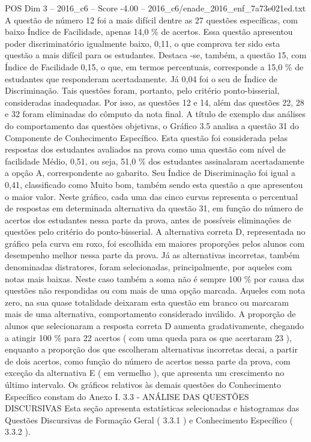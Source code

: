 \begin{textsample}{POS Dim 3 – 2016\_c6 – Score -4.00 – 2016\_c6/enade\_2016\_enf\_7a73e021ed.txt}
A questão de número 12 foi a mais difícil dentre as 27 questões específicas, com baixo Índice de Facilidade, apenas 14,0 \% de acertos.
Essa questão apresentou poder discriminatório igualmente baixo, 0,11, o que comprova ter sido esta questão a mais difícil para os estudantes.
Destaca -se, também, a questão 15, com Índice de Facilidade 0,15, o que, em termos percentuais, corresponde a 15,0 \% de estudantes que responderam acertadamente.
Já 0,04 foi o seu de Índice de Discriminação.
Tais questões foram, portanto, pelo critério ponto-bisserial, consideradas inadequadas.
Por isso, as questões 12 e 14, além das questões 22, 28 e 32 foram eliminadas do cômputo da nota final.
A título de exemplo das análises do comportamento das questões objetivas, o Gráfico 3.5 analisa a questão 31 do Componente de Conhecimento Específico.
Esta questão foi considerada pelas respostas dos estudantes avaliados na prova como uma questão com nível de facilidade Médio, 0,51, ou seja, 51,0 \% dos estudantes assinalaram acertadamente a opção A, correspondente ao gabarito.
Seu Índice de Discriminação foi igual a 0,41, classificado como Muito bom, também sendo esta questão a que apresentou o maior valor.
Neste gráfico, cada uma das cinco curvas representa o percentual de respostas em determinada alternativa da questão 31, em função do número de acertos dos estudantes nessa parte da prova, antes de possíveis eliminações de questões pelo critério do ponto-bisserial.
A alternativa correta D, representada no gráfico pela curva em roxo, foi escolhida em maiores proporções pelos alunos com desempenho melhor nessa parte da prova.
Já as alternativas incorretas, também denominadas distratores, foram selecionadas, principalmente, por aqueles com notas mais baixas.
Neste caso também a soma não é sempre 100 \% por causa das questões não respondidas ou com mais de uma opção marcada.
Aqueles com nota zero, na sua quase totalidade deixaram esta questão em branco ou marcaram mais de uma alternativa, comportamento considerado inválido.
A proporção de alunos que selecionaram a resposta correta D aumenta gradativamente, chegando a atingir 100 \% para 22 acertos ( com uma queda para os que acertaram 23 ), enquanto a proporção dos que escolheram alternativas incorretas decai, a partir de dois acertos, como função do número de acertos nessa parte da prova, com exceção da alternativa E ( em vermelho ), que apresenta um crescimento no último intervalo.
Os gráficos relativos às demais questões do Conhecimento Específico constam do Anexo I. 3.3 - ANÁLISE DAS QUESTÕES DISCURSIVAS Esta seção apresenta estatísticas selecionadas e histogramas das Questões Discursivas de Formação Geral ( 3.3.1 ) e Conhecimento Específico ( 3.3.2 ).

\end{textsample}
